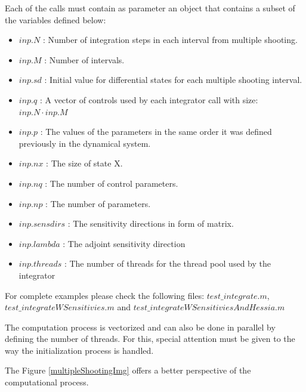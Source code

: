 \documentclass[12pt, letterpaper]{article}
\begin{document}
Each of the calls must contain as parameter an object that contains a subset of the variables defined below:

\begin{itemize}
	\item $inp.N$ :  Number of integration steps in each interval from multiple shooting. 
	\item $inp.M$ : Number of intervals. 

	\item $inp.sd$ : Initial value for differential states for each multiple shooting interval.
	
	\item $inp.q$ : A vector of controls used by each integrator call with size: $inp.N \cdot inp.M$

	\item $inp.p$ : The values of the parameters in the same order it was defined previously in the dynamical system.


	\item $inp.nx$ : The size of state X.
	\item $inp.nq$ : The number of control parameters.
	\item $inp.np$ : The number of parameters.
	\item $inp.sensdirs$ : The sensitivity directions in form of matrix.
	\item $inp.lambda$ : The adjoint sensitivity direction
	\item $inp.threads$ : The number of threads for the thread pool used by the integrator
\end{itemize}

For complete examples please check the following files: $test\_integrate.m$, $test\_integrateWSensitivies.m$ and
$test\_integrateWSensitiviesAndHessia.m$

The computation process is vectorized and can also be done in parallel by defining the number of threads. For this, special attention must be given to the way the initialization process is handled.

The Figure \ref{multipleShootingImg} offers a better perspective of the computational process.
\end{document}
